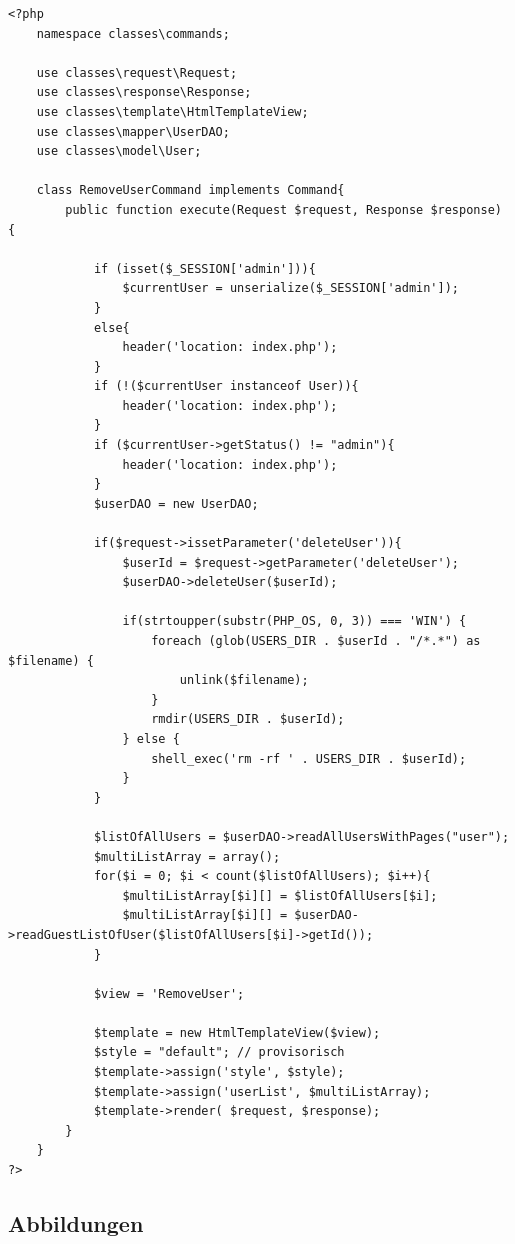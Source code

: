 \documentclass[10pt]{scrarticle}
\begin{document}
\lstset{firstnumber=1, basicstyle=\footnotesize}
\begin{lstlisting}[caption={RemoveUserCommand.php}, label={lst:RemoveUserCommand}]
<?php
    namespace classes\commands;

    use classes\request\Request;
    use classes\response\Response;
    use classes\template\HtmlTemplateView;
    use classes\mapper\UserDAO;
    use classes\model\User;

    class RemoveUserCommand implements Command{
        public function execute(Request $request, Response $response) {

            if (isset($_SESSION['admin'])){
                $currentUser = unserialize($_SESSION['admin']);
            }
            else{
                header('location: index.php');
            }
            if (!($currentUser instanceof User)){
                header('location: index.php');
            }
            if ($currentUser->getStatus() != "admin"){
                header('location: index.php');
            }
            $userDAO = new UserDAO;

            if($request->issetParameter('deleteUser')){
                $userId = $request->getParameter('deleteUser');
                $userDAO->deleteUser($userId);

                if(strtoupper(substr(PHP_OS, 0, 3)) === 'WIN') {
                    foreach (glob(USERS_DIR . $userId . "/*.*") as $filename) {
                        unlink($filename);
                    }
                    rmdir(USERS_DIR . $userId);
                } else {
                    shell_exec('rm -rf ' . USERS_DIR . $userId);
                }
            }

            $listOfAllUsers = $userDAO->readAllUsersWithPages("user");
            $multiListArray = array();
            for($i = 0; $i < count($listOfAllUsers); $i++){
                $multiListArray[$i][] = $listOfAllUsers[$i];
                $multiListArray[$i][] = $userDAO->readGuestListOfUser($listOfAllUsers[$i]->getId());
            }

            $view = 'RemoveUser';

            $template = new HtmlTemplateView($view);
            $style = "default"; // provisorisch
            $template->assign('style', $style);
            $template->assign('userList', $multiListArray);
            $template->render( $request, $response);
        }
    }
?>
\end{lstlisting}

\subsection{Abbildungen}
\end{document}
